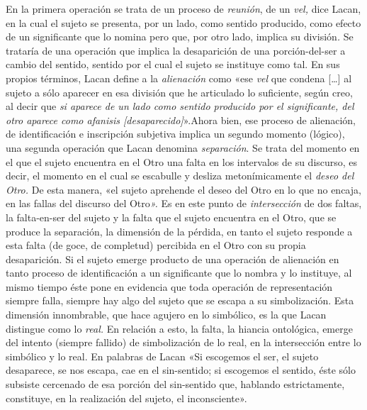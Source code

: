 En la primera operación se trata de un proceso de \emph{reunión}, de un \emph{vel, }dice Lacan, en la cual el sujeto se presenta, por un lado, como sentido producido, como efecto de un significante que lo nomina pero que, por otro lado, implica su división\emph{. }Se trataría de una operación que implica la desaparición de una porción-del-ser a cambio del sentido, sentido por el cual el sujeto se instituye como tal. En sus propios términos, Lacan define a la \emph{alienación} como «ese \emph{vel} que condena {[}\ldots{]} al sujeto a sólo aparecer en esa división que he articulado lo suficiente, según creo, al decir que \emph{si aparece de un lado como sentido producido por el significante, del otro aparece como afanisis {[}desaparecido{]}}».Ahora bien, ese proceso de alienación, de identificación e inscripción subjetiva implica un segundo momento (lógico), una segunda operación que Lacan denomina \emph{separación}. Se trata del momento en el que el sujeto encuentra en el Otro una falta en los intervalos de su discurso, es decir, el momento en el cual se escabulle y desliza metonímicamente el \emph{deseo del Otro. }De esta manera, «el sujeto aprehende el deseo del Otro en lo que no encaja, en las fallas del discurso del Otro\emph{». }Es en este punto de \emph{intersección }de dos faltas, la falta-en-ser del sujeto y la falta que el sujeto encuentra en el Otro, que se produce la separación, la dimensión de la pérdida, en tanto el sujeto responde a esta falta (de goce, de completud) percibida en el Otro con su propia desaparición. Si el sujeto emerge producto de una operación de alienación en tanto proceso de identificación a un significante que lo nombra y lo instituye, al mismo tiempo éste pone en evidencia que toda operación de representación siempre falla, siempre hay algo del sujeto que se escapa a su simbolización. Esta dimensión innombrable, que hace agujero en lo simbólico, es la que Lacan distingue como lo \emph{real. }En relación a esto, la falta, la hiancia ontológica, emerge del intento (siempre fallido) de simbolización de lo real, en la intersección entre lo simbólico y lo real. En palabras de Lacan «Si escogemos el ser, el sujeto desaparece, se nos escapa, cae en el sin-sentido; si escogemos el sentido, éste sólo subsiste cercenado de esa porción del sin-sentido que, hablando estrictamente, constituye, en la realización del sujeto, el inconsciente».

